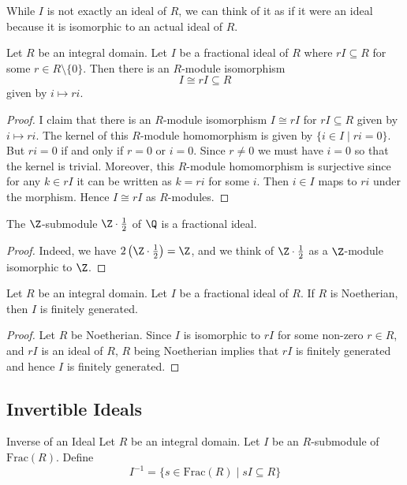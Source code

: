 \documentclass[a4paper]{article}
\begin{document}
While $I$ is not exactly an ideal of $R$, we can think of it as if it were an ideal because it is isomorphic to an actual ideal of $R$. 

\begin{lmm}{}{} Let $R$ be an integral domain. Let $I$ be a fractional ideal of $R$ where $rI\subseteq R$ for some $r\in R\setminus\{0\}$. Then there is an $R$-module isomorphism $$I\cong rI\subseteq R$$ given by $i\mapsto ri$. \tcbline
\begin{proof}
I claim that there is an $R$-module isomorphism $I\cong rI$ for $rI\subseteq R$ given by $i\mapsto ri$. The kernel of this $R$-module homomorphism is given by $\{i\in I\;|\;ri=0\}$. But $ri=0$ if and only if $r=0$ or $i=0$. Since $r\neq 0$ we must have $i=0$ so that the kernel is trivial. Moreover, this $R$-module homomorphism is surjective since for any $k\in rI$ it can be written as $k=ri$ for some $i$. Then $i\in I$ maps to $ri$ under the morphism. Hence $I\cong rI$ as $R$-modules. 
\end{proof}
\end{lmm}

\begin{eg}{}{} The $\Z$-submodule $\Z\cdot\frac{1}{2}$ of $\Q$ is a fractional ideal. \tcbline
\begin{proof}
Indeed, we have $2\left(\Z\cdot\frac{1}{2}\right)=\Z$, and we think of $\Z\cdot\frac{1}{2}$ as a $\Z$-module isomorphic to $\Z$. 
\end{proof}
\end{eg}

\begin{lmm}{}{} Let $R$ be an integral domain. Let $I$ be a fractional ideal of $R$. If $R$ is Noetherian, then $I$ is finitely generated. \tcbline
\begin{proof}
Let $R$ be Noetherian. Since $I$ is isomorphic to $rI$ for some non-zero $r\in R$, and $rI$ is an ideal of $R$, $R$ being Noetherian implies that $rI$ is finitely generated and hence $I$ is finitely generated. 
\end{proof}
\end{lmm}

\subsection{Invertible Ideals}
\begin{defn}{Inverse of an Ideal}{} Let $R$ be an integral domain. Let $I$ be an $R$-submodule of $\text{Frac}(R)$. Define $$I^{-1}=\{s\in\text{Frac}(R)\;|\;sI\subseteq R\}$$
\end{defn}
\end{document}

